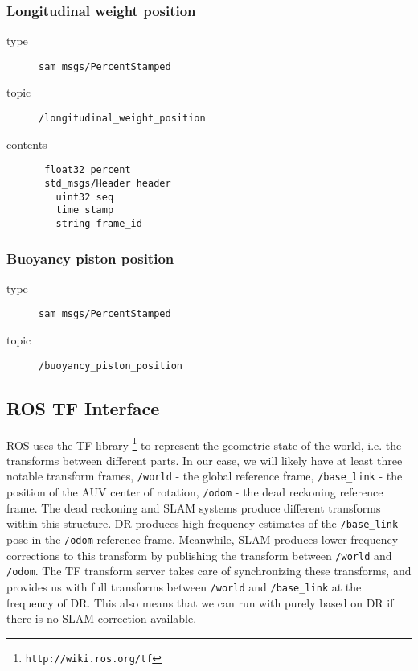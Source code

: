 \documentclass[9pt,technote]{IEEEtran} %
\begin{document}
\subsubsection{Longitudinal weight position} 

\begin{description}
\item[type] \texttt{sam\_msgs/PercentStamped}
\item[topic] \texttt{/longitudinal\_weight\_position}
\item[contents] \begin{scriptsize}
\begin{verbatim}
 float32 percent
 std_msgs/Header header
   uint32 seq
   time stamp
   string frame_id
\end{verbatim}
\end{scriptsize}
\end{description}

\subsubsection{Buoyancy piston position}

\begin{description}
\item[type] \texttt{sam\_msgs/PercentStamped}
\item[topic] \texttt{/buoyancy\_piston\_position}
\end{description}

\subsection{ROS TF Interface}
\label{tf}

ROS uses the TF library \footnote{\texttt{http://wiki.ros.org/tf}} to represent
the geometric state of the world, i.e. the transforms between different parts.
In our case, we will likely have at least three notable transform frames,
\texttt{/world} - the global reference frame,
\texttt{/base\_link} - the position of the AUV center of rotation,
\texttt{/odom} - the dead reckoning reference frame.
The dead reckoning and SLAM systems produce different transforms within
this structure. DR produces high-frequency estimates of the \texttt{/base\_link}
pose in the \texttt{/odom} reference frame. Meanwhile, SLAM produces lower
frequency corrections to this transform by publishing the transform
between \texttt{/world} and \texttt{/odom}. The TF transform server takes
care of synchronizing these transforms, and provides us with
full transforms between \texttt{/world} and \texttt{/base\_link}
at the frequency of DR. This also means that we can run with
purely based on DR if there is no SLAM correction available.
\end{document}
